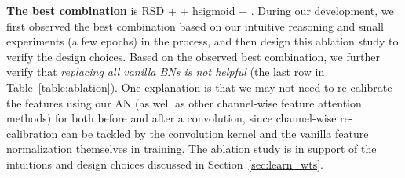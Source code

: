 \documentclass[runningheads]{llncs}
\begin{document}
\textbf{The best combination} is RSD +  + hsigmoid + . During our development, we first observed the best combination based on our intuitive reasoning and small experiments (a few epochs) in the process, and then design this ablation study to verify the design choices. Based on the observed best combination, we further verify that \textit{replacing all vanilla BNs is not helpful} (the last row in Table~\ref{table:ablation}). One explanation is that we may not need to re-calibrate the features using our AN (as well as other channel-wise feature attention methods) for both before and after a  convolution, since channel-wise re-calibration can be tackled by the  convolution kernel and the vanilla feature normalization themselves in training.  
The ablation study is in support of the intuitions and design choices discussed in Section~\ref{sec:learn_wts}. 
\end{document}
